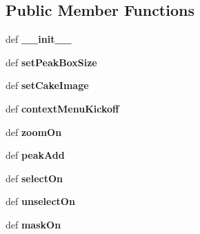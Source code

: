 \subsection*{Public Member Functions}
\begin{DoxyCompactItemize}
\item 
\hypertarget{classmyImDisplay_1_1myImDisplay_ac84ff467e290df4e4ab1d4c65d4267f5}{def {\bfseries \-\_\-\-\_\-init\-\_\-\-\_\-}}\label{classmyImDisplay_1_1myImDisplay_ac84ff467e290df4e4ab1d4c65d4267f5}

\item 
\hypertarget{classmyImDisplay_1_1myImDisplay_ab744180f478698e143f8470430f1d192}{def {\bfseries set\-Peak\-Box\-Size}}\label{classmyImDisplay_1_1myImDisplay_ab744180f478698e143f8470430f1d192}

\item 
\hypertarget{classmyImDisplay_1_1myImDisplay_ab09a20ba11a398d503273b7f422c2644}{def {\bfseries set\-Cake\-Image}}\label{classmyImDisplay_1_1myImDisplay_ab09a20ba11a398d503273b7f422c2644}

\item 
\hypertarget{classmyImDisplay_1_1myImDisplay_a3352c4bc953e0a9f393d08871e5d1c31}{def {\bfseries context\-Menu\-Kickoff}}\label{classmyImDisplay_1_1myImDisplay_a3352c4bc953e0a9f393d08871e5d1c31}

\item 
\hypertarget{classmyImDisplay_1_1myImDisplay_a8093fb201222b74f57c27297f1e6d84a}{def {\bfseries zoom\-On}}\label{classmyImDisplay_1_1myImDisplay_a8093fb201222b74f57c27297f1e6d84a}

\item 
\hypertarget{classmyImDisplay_1_1myImDisplay_ae60543e0ec298c4a15e385f11091b675}{def {\bfseries peak\-Add}}\label{classmyImDisplay_1_1myImDisplay_ae60543e0ec298c4a15e385f11091b675}

\item 
\hypertarget{classmyImDisplay_1_1myImDisplay_a29d16cbb8188fd3f8c15fa6014b231e8}{def {\bfseries select\-On}}\label{classmyImDisplay_1_1myImDisplay_a29d16cbb8188fd3f8c15fa6014b231e8}

\item 
\hypertarget{classmyImDisplay_1_1myImDisplay_a6f9207ced879b40fb101f1994ba71eef}{def {\bfseries unselect\-On}}\label{classmyImDisplay_1_1myImDisplay_a6f9207ced879b40fb101f1994ba71eef}

\item 
\hypertarget{classmyImDisplay_1_1myImDisplay_a7411fd0ab99914cd633c779309de1d07}{def {\bfseries mask\-On}}\label{classmyImDisplay_1_1myImDisplay_a7411fd0ab99914cd633c779309de1d07}


\end{DoxyCompactItemize}
